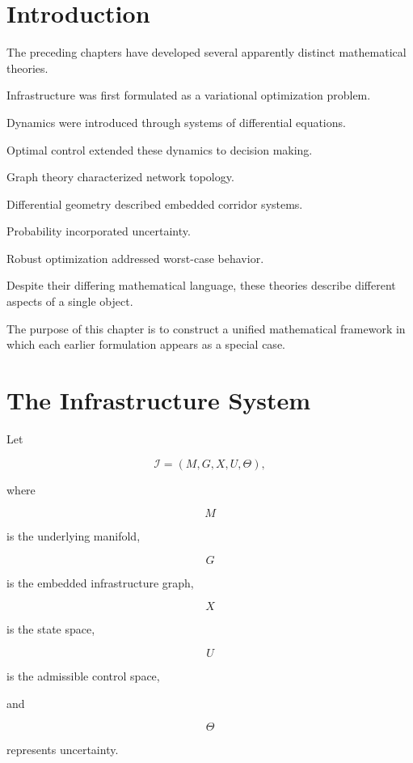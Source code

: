 \documentclass[11pt,fleqn]{book}
\numberwithin{equation}{chapter}
\theoremstyle{plain}
\theoremstyle{definition}
\theoremstyle{remark}
\begin{document}
\section{Introduction}

The preceding chapters have developed several apparently distinct
mathematical theories.

Infrastructure was first formulated as a variational optimization
problem.

Dynamics were introduced through systems of differential equations.

Optimal control extended these dynamics to decision making.

Graph theory characterized network topology.

Differential geometry described embedded corridor systems.

Probability incorporated uncertainty.

Robust optimization addressed worst-case behavior.

Despite their differing mathematical language, these theories describe
different aspects of a single object.

The purpose of this chapter is to construct a unified mathematical
framework in which each earlier formulation appears as a special case.


\section{The Infrastructure System}

Let

\[
\mathcal I
=
(M,G,X,U,\Theta),
\]

where

\[
M
\]

is the underlying manifold,

\[
G
\]

is the embedded infrastructure graph,

\[
X
\]

is the state space,

\[
U
\]

is the admissible control space,

and

\[
\Theta
\]

represents uncertainty.

\end{document}
